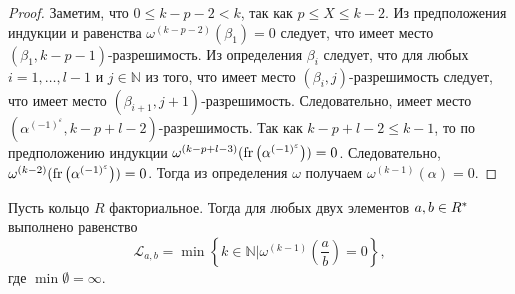 \documentclass[_00_dissertation.tex]{subfiles}
\begin{document}
\begin{proof}
    Заметим, что $0 \le k-p-2 < k$, так как $p \le X \le k-2$.
    Из предположения индукции и равенства $\omega^{(k-p-2)}(\beta_1) = 0$ следует, что имеет место $(\beta_1, k-p-1)$-разрешимость.
    Из определения $\beta_i$ следует, что для любых $i = 1, \dots, l-1$ и $j \in \mathbb{N}$ из того, что имеет место $(\beta_i, j)$-разрешимость следует, что имеет место $(\beta_{i+1}, j+1)$-разрешимость.
    Следовательно, имеет место $(\alpha^{(-1)^{\varepsilon}}, k-p+l-2)$-разрешимость.
    Так как $k - p + l - 2 \le k - 1$, то по предположению индукции $\omega^{(k-p+l-3)}(\textrm{fr}\left(\alpha^{(-1)^{\varepsilon}}\right)) = 0$.
    Следовательно, $\omega^{(k-2)}(\textrm{fr}\left(\alpha^{(-1)^{\varepsilon}}\right)) = 0$.
    Тогда из определения $\omega$ получаем $\omega^{(k-1)}(\alpha) = 0$.
\end{proof}

\begin{lemma}\label{lemma:euclidean_algorithm_and_minima}
    Пусть кольцо $R$ факториальное.
    Тогда для любых двух элементов $a, b \in R^{*}$ выполнено равенство
    \begin{equation*}
        \mathcal{L}_{a, b} = \min\left\{
            k \in \mathbb{N} \big| \omega^{(k-1)}\left(\frac{a}{b}\right) = 0
        \right\},
    \end{equation*}
    где $\min \emptyset = \infty$.
\end{lemma}
\end{document}
